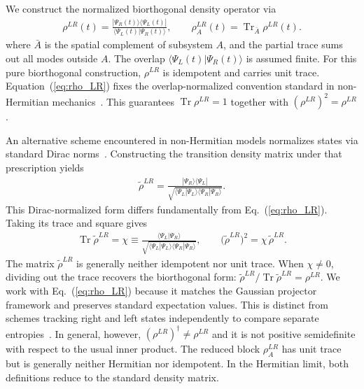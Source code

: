 \documentclass[aps,prb,reprint,superscriptaddress,amsmath,amssymb,floatfix]{revtex4-2}
\begin{document}
  We construct the normalized biorthogonal density operator via~\cite{Brody2014,Qiu2019}
\begin{equation}
\begin{aligned}
\rho^{LR}(t) = \frac{ |\Psi_R(t)\rangle\langle\Psi_L(t)| }{ \langle\Psi_L(t)|\Psi_R(t)\rangle }, \qquad \rho_A^{LR}(t) = \operatorname{Tr}_{\bar A}\rho^{LR}(t).
\end{aligned} \label{eq:rho_LR}
\end{equation}
where $\bar A$ is the spatial complement of subsystem $A$, and the partial trace sums out all modes outside $A$. The overlap $\langle\Psi_L(t)\vert{}\Psi_R(t)\rangle$ is assumed finite. For this pure biorthogonal construction, $\rho^{LR}$ is idempotent and carries unit trace.
%
Equation~(\ref{eq:rho_LR}) fixes the overlap-normalized convention standard in non-Hermitian mechanics~\cite{Brody2014,Qiu2019}. This guarantees $\operatorname{Tr}\rho^{LR}=1$ together with $(\rho^{LR})^2=\rho^{LR}$.

An alternative scheme encountered in non-Hermitian models normalizes states via standard Dirac norms~\cite{Zhang2025SelfNormal}. Constructing the transition density matrix under that prescription yields
\begin{equation}
\begin{aligned}
\widetilde{\rho}^{LR} = \frac{ |\Psi_R\rangle\langle\Psi_L| }{ \sqrt{ \langle\Psi_L|\Psi_L\rangle \langle\Psi_R|\Psi_R\rangle } }.
\end{aligned} \label{eq:dirac_normalized_transition_operator}
\end{equation}
This Dirac-normalized form differs fundamentally from Eq.~(\ref{eq:rho_LR}). Taking its trace and square gives
\begin{equation}
\begin{aligned}
\operatorname{Tr}\widetilde{\rho}^{LR} \!= \chi \equiv\! \frac{ \langle\Psi_L|\Psi_R\rangle }{ \sqrt{ \langle\Psi_L|\Psi_L\rangle \langle\Psi_R|\Psi_R\rangle } }, \qquad \bigl(\widetilde{\rho}^{LR}\bigr)^2 \!= \chi\,\widetilde{\rho}^{LR}.
\end{aligned} \label{eq:dirac_vs_biorthogonal_normalization}
\end{equation}
The matrix $\widetilde{\rho}^{LR}$ is generally neither idempotent nor unit trace.
When $\chi\neq0$, dividing out the trace recovers the biorthogonal form: $\widetilde{\rho}^{LR}/\operatorname{Tr}\widetilde{\rho}^{LR}=\rho^{LR}$. We work with Eq.~(\ref{eq:rho_LR}) because it matches the Gaussian projector framework and preserves standard expectation values. This is distinct from schemes tracking right and left states independently to compare separate entropies~\cite{Lakkaraju2026}. 
In general, however, $(\rho^{LR})^\dagger\neq\rho^{LR}$ and it is not positive semidefinite with respect to the usual inner product. The reduced block $\rho_A^{LR}$ has unit trace but is generally neither Hermitian nor idempotent.
In the Hermitian limit, both definitions reduce to the standard density matrix.
\end{document}
